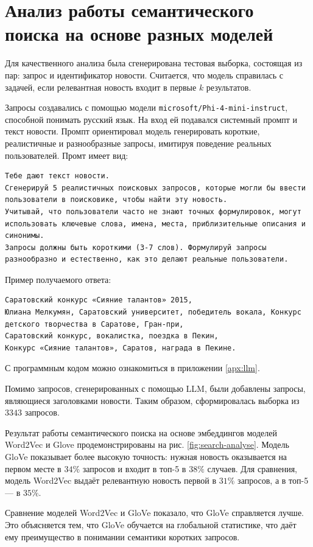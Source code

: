 \documentclass[coursework]{SCWorks}
\begin{document}
\section{Анализ работы семантического поиска на основе разных моделей}
Для качественного анализа была сгенерирована тестовая выборка, состоящая из пар: запрос и идентификатор новости. Считается, что модель справилась с задачей, если релевантная новость входит в первые $k$ результатов.

Запросы создавались с помощью модели \verb|microsoft/Phi-4-mini-instruct|, способной понимать русский язык. На вход ей подавался системный промпт и текст новости. Промпт ориентировал модель генерировать короткие, реалистичные и разнообразные запросы, имитируя поведение реальных пользователей. Промт имеет вид:
\begin{verbatim}
Тебе дают текст новости. 
Сгенерируй 5 реалистичных поисковых запросов, которые могли бы ввести пользователи в поисковике, чтобы найти эту новость. 
Учитывай, что пользователи часто не знают точных формулировок, могут использовать ключевые слова, имена, места, приблизительные описания и синонимы. 
Запросы должны быть короткими (3-7 слов). Формулируй запросы разнообразно и естественно, как это делают реальные пользователи.
\end{verbatim}

Пример получаемого ответа:
\begin{verbatim}
Саратовский конкурс «Сияние талантов» 2015, 
Юлиана Мелкумян, Саратовский университет, победитель вокала, Конкурс детского творчества в Саратове, Гран-при, 
Саратовский конкурс, вокалистка, поездка в Пекин, 
Конкурс «Сияние талантов», Саратов, награда в Пекине.
\end{verbatim}

С программным кодом можно ознакомиться в приложении \ref{apx:llm}.

Помимо запросов, сгенерированных с помощью LLM, были добавлены запросы, являющиеся заголовками новости.
Таким образом, сформировалась выборка из $3343$ запросов.

Результат работы семантического поиска на основе эмбеддингов моделей Word2Vec и Glove продемонстрированы на рис. \ref{fig:search-analyse}. Модель GloVe показывает более высокую точность: нужная новость оказывается на первом месте в $34\%$ запросов и входит в топ-5 в $38\%$ случаев. Для сравнения, модель Word2Vec выдаёт релевантную новость первой в $31\%$ запросов, а в топ-5 — в $35\%$.

Сравнение моделей Word2Vec и GloVe показало, что GloVe справляется лучше. Это объясняется тем, что GloVe обучается на глобальной статистике, что даёт ему преимущество в понимании семантики коротких запросов.
\end{document}
